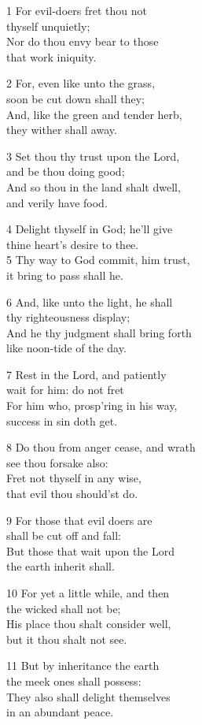 \begin{multicols}{3}
1 For evil-doers fret thou not\\
thyself unquietly;\\
Nor do thou envy bear to those\\
that work iniquity.

2 For, even like unto the grass,\\
soon be cut down shall they;\\
And, like the green and tender herb,\\
they wither shall away.

3 Set thou thy trust upon the Lord,\\
and be thou doing good;\\
And so thou in the land shalt dwell,\\
and verily have food.

4 Delight thyself in God; he’ll give\\
thine heart’s desire to thee.\\
5 Thy way to God commit, him trust,\\
it bring to pass shall he.

6 And, like unto the light, he shall\\
thy righteousness display;\\
And he thy judgment shall bring forth\\
like noon-tide of the day.

7 Rest in the Lord, and patiently\\
wait for him: do not fret\\
For him who, prosp’ring in his way,\\
success in sin doth get.

8 Do thou from anger cease, and wrath\\
see thou forsake also:\\
Fret not thyself in any wise,\\
that evil thou should’st do.

9 For those that evil doers are\\
shall be cut off and fall:\\
But those that wait upon the Lord\\
the earth inherit shall.

10 For yet a little while, and then\\
the wicked shall not be;\\
His place thou shalt consider well,\\
but it thou shalt not see.

11 But by inheritance the earth\\
the meek ones shall possess:\\
They also shall delight themselves\\
in an abundant peace.


\end{multicols}
